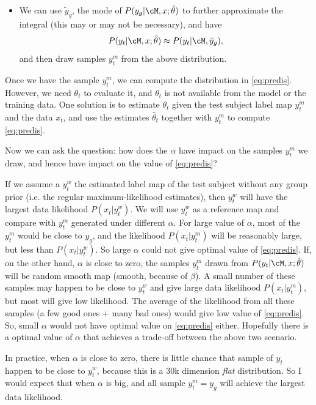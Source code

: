 \documentclass[12pt]{article}
\begin{document}
\begin{itemize}
    \item We can use $\tilde y_g$, the mode of $P(y_g | \cM, x; \hat \theta)$ to
      further approximate the integral (this may or may not be necessary), and
      have
      \[
      P(y_t|\cM, x; \hat \theta)  \approx P(y_t | \cM, \tilde y_g),
      \]
      and then draw samples $y_t^m$ from the above distribution.
\end{itemize}

Once we have the sample $y_t^m$, we can compute the distribution in
\eqref{eq:predis}. However, we need $\theta_t$ to evaluate it, and $\theta_t$ is
not available from the model or the training data. One solution is to estimate
$\theta_t$ given the test subject label map $y_t^m$ and the data $x_t$, and use
the estimates $\hat \theta_t$ together with $y_t^m$ to compute
\eqref{eq:predis}.

Now we can ask the question: how does the $\alpha$ have impact on the samples
$y_t^m$ we draw, and hence have impact on the value of \eqref{eq:predis}?

If we assume a $y_t^w$ the estimated label map of the test subject without any
group prior (i.e. the regular maximum-likelihood estimates), then $y_t^w$ will
have the largest data likelihood $P(x_t | y_t^w)$. We will use $y_t^w$ as a
reference map and compare with $y_t^m$ generated under different $\alpha$. For
large value of $\alpha$, most of the $y_t^m$ would be close to $y_g$, and the
likelihood $P(x_t | y_t^m)$ will be reasonably large, but less than $P(x_t |
y_t^w)$. So large $\alpha$ could not give optimal value of
\eqref{eq:predis}. If, on the other hand, $\alpha$ is close to zero, the samples
$y_t^m$ drawn from $P(y_t|\cM, x; \hat \theta)$ will be random smooth map
(smooth, because of $\beta$). A small number of these samples may happen to be
close to $y_t^w$ and give large data likelihood $P(x_t | y_t^m)$, but most will
give low likelihood. The average of the likelihood from all these samples (a few
good ones + many bad ones) would give low value of \eqref{eq:predis}. So, small
$\alpha$ would not have optimal value on \eqref{eq:predis} either. Hopefully
there is a optimal value of $\alpha$ that achieves a trade-off between the above
two scenario.

In practice, when $\alpha$ is close to zero, there is little chance that sample
of $y_t$ happen to be close to $y_t^w$, because this is a 30k dimension
\emph{flat} distribution. So I would expect that when $\alpha$ is big, and all
sample $y_t^m = y_g$ will achieve the largest data likelihood. 
\end{document}
